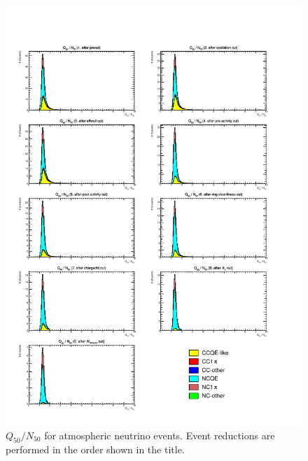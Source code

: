 \begin{figure}[h]
	\centering
	\includegraphics[width=15cm]{PDF/Dist_ATM/Che_50deg_tag_ge1/All/q50n50}
	\caption[$Q_{50}/N_{50}$ for atmospheric neutrino events]{
	$Q_{50}/N_{50}$ for atmospheric neutrino events.
	Event reductions are performed in the order shown in the title.
	}\label{ATM_q50n50}
\end{figure}

